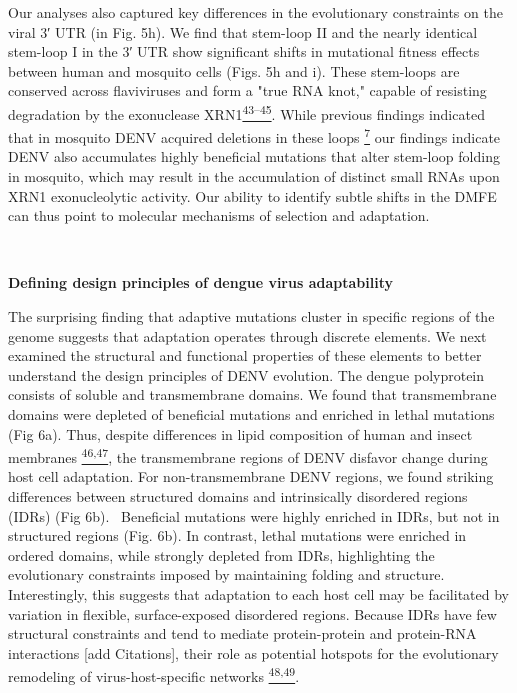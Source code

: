 \documentclass[
]{article}
\begin{document}
Our analyses also captured key differences in the evolutionary
constraints on the viral 3′ UTR (in Fig. 5h). We find that stem-loop II
and the nearly identical stem-loop I in the 3′ UTR show significant
shifts in mutational fitness effects between human and mosquito cells
(Figs. 5h and i). These stem-loops are conserved across flaviviruses and
form a "true RNA knot," capable of resisting degradation by the
exonuclease
XRN1\href{https://paperpile.com/c/REZjPf/Zs1LR+b9GgS+o9YCc}{\textsuperscript{43--45}}.
While previous findings indicated that in mosquito DENV acquired
deletions in these loops
\href{https://paperpile.com/c/REZjPf/r0H6}{\textsuperscript{7}} our
findings indicate DENV also accumulates highly beneficial mutations that
alter stem-loop folding in mosquito, which may result in the
accumulation of distinct small RNAs upon XRN1 exonucleolytic activity.
Our ability to identify subtle shifts in the DMFE can thus point to
molecular mechanisms of selection and adaptation.

~

\textbf{Defining design principles of dengue virus adaptability}

The surprising finding that adaptive mutations cluster in specific
regions of the genome suggests that adaptation operates through discrete
elements. We next examined the structural and functional properties of
these elements to better understand the design principles of DENV
evolution. The dengue polyprotein consists of soluble and transmembrane
domains. We found that transmembrane domains were depleted of beneficial
mutations and enriched in lethal mutations (Fig 6a). Thus, despite
differences in lipid composition of human and insect membranes
\href{https://paperpile.com/c/REZjPf/XAKft+zRdX7}{\textsuperscript{46,47}},
the transmembrane regions of DENV disfavor change during host cell
adaptation. For non-transmembrane DENV regions, we found striking
differences between structured domains and intrinsically disordered
regions (IDRs) (Fig 6b).~ Beneficial mutations were highly enriched in
IDRs, but not in structured regions (Fig. 6b). In contrast, lethal
mutations were enriched in ordered domains, while strongly depleted from
IDRs, highlighting the evolutionary constraints imposed by maintaining
folding and structure. Interestingly, this suggests that adaptation to
each host cell may be facilitated by variation in flexible,
surface-exposed disordered regions. Because IDRs have few structural
constraints and tend to mediate protein-protein and protein-RNA
interactions {[}add Citations{]}, their role as potential hotspots for
the evolutionary remodeling of virus-host-specific networks
\href{https://paperpile.com/c/REZjPf/mhPR+KHg7}{\textsuperscript{48,49}}.
\end{document}
